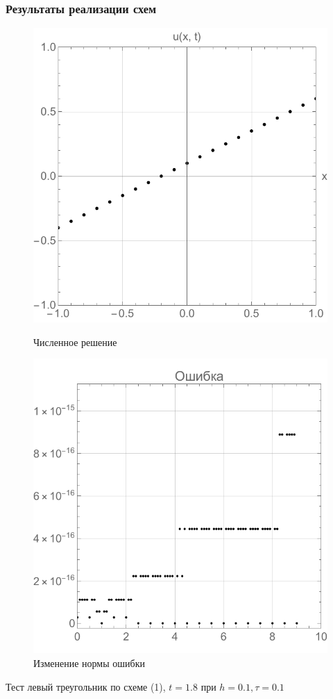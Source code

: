 \documentclass{beamer}
\begin{document}
\begin{frame}
	\frametitle{Результаты реализации схем}
	\begin{figure}
		\centering
		\begin{minipage}{0.45\textwidth}
			\centering
			\includegraphics[width=\textwidth]{res3_2}
			\caption{Численное решение}
			\label{fig:first}
		\end{minipage}\hfill
		\begin{minipage}{0.45\textwidth}
			\centering
			\includegraphics[width=\textwidth]{res3_3}
			\caption{Изменение нормы ошибки}
			\label{fig:second}
		\end{minipage}
	\end{figure}
	\centering Тест левый треугольник по схеме (1), $t = 1.8$ при $h = 0.1, \tau = 0.1$
\end{frame}
\end{document}
